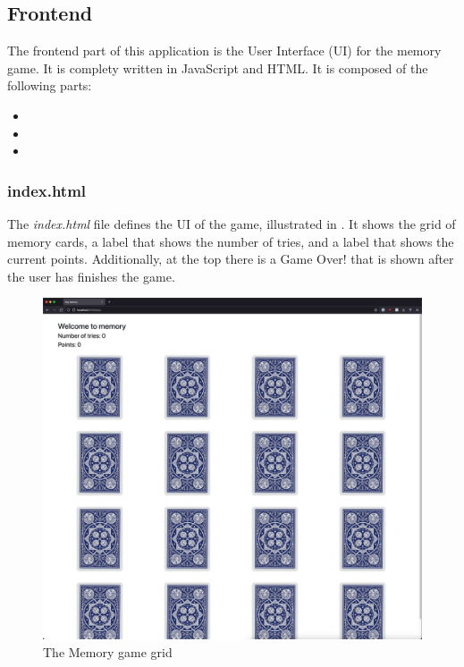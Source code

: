 \newpage
\subsection{Frontend}\label{subsec:03_impl_frontend}
The frontend part of this application is the User Interface (UI) for the memory game. It is complety written in JavaScript and HTML.
%
It is composed of the following parts:
\begin{itemize}
\item {}
\item {}
\item {}
\end{itemize}

\subsubsection{index.html}\label{subsubsec:03_impl_frontend_index}
The \textit{index.html} file defines the UI of the game, illustrated in . It shows the grid of memory cards, a label that shows the number of tries, and a label that shows the current points. Additionally, at the top there is a Game Over! that is shown after the user has finishes the game.
\begin{figure}[h]
\centering
\includegraphics[scale=0.2]{images/03_impl/frontend/grid}
\caption{The Memory game grid}
\label{fig:03_impl_frontend_index_grid}
\end{figure}

